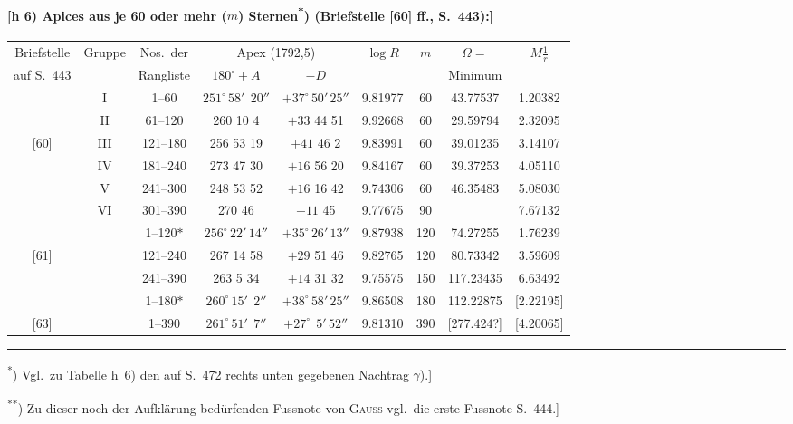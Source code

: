 \documentclass[12pt,a4paper]{article}
\theoremstyle{plain}
\theoremstyle{definition}
\theoremstyle{remark}
\begin{document}
\medskip
\paragraph*{[h 6) Apices aus je 60 oder mehr ($m$) Sternen\textsuperscript{*})
(Briefstelle [60] ff., S.~443):]}

\begin{small}
\begin{center}
\begin{tabular}{|c|c|c||c|c||c|c|c|c|}
\hline
Briefstelle & Gruppe & Nos.~der &
\multicolumn{2}{c||}{Apex (1792,5)} &
$\log R$ & $m$ & $\Omega =$ & $M\frac{1}{r}$ \\
auf S.~443 & & Rangliste & $180^{\circ}+A$ & $-D$ & & & Minimum & \\
\hline
& I & 1--\phantom{0}60 & $251^{\circ}\,58'\;\,20''$ & $+37^{\circ}\,50'\,25''$ & 9.81977 & 60 & 43.77537 & 1.20382 \\
& II & 61--120 & 260 \phantom{0}10 \phantom{0}\phantom{0}4 & $+33$ 44 51 & 9.92668 & 60 & 29.59794 & 2.32095 \\
{[60]} & III & 121--180 & 256 53 19 & $+41$ 46 \phantom{0}2 & 9.83991 & 60 & 39.01235 & 3.14107 \\
& IV & 181--240 & 273 47 30 & $+16$ 56 20 & 9.84167 & 60 & 39.37253 & 4.05110 \\
& V & 241--300 & 248 53 52 & $+16$ 16 42 & 9.74306 & 60 & 46.35483 & 5.08030 \\
& VI & 301--390 & 270 46 & $+11$ 45 & 9.77675 & 90 & & 7.67132 \\
\hline
& & 1--120$*$ & $256^{\circ}\,22'\,14''$ & $+35^{\circ}\,26'\,13''$ & 9.87938 & 120 & 74.27255 & 1.76239 \\
{[61]} & & 121--240 & 267 14 58 & $+29$ 51 46 & 9.82765 & 120 & 80.73342 & 3.59609 \\
& & 241--390 & 263 \phantom{0}5 34 & $+14$ 31 32 & 9.75575 & 150 & 117.23435 & 6.63492 \\
\hline
& & 1--180$*$ & $260^{\circ}\,15'\;\,2''$ & $+38^{\circ}\,58'\,25''$ & 9.86508 & 180 & 112.22875 & [2.22195] \\
{[63]} & & 1--390 & $261^{\circ}\,51'\;\,7''$ & $+27^{\circ}\;\,5'\,52''$ & 9.81310 & 390 & [277.424?] & [4.20065] \\
\hline
\end{tabular}
\end{center}
\end{small}

\medskip
\noindent\rule{\textwidth}{0.4pt}
\begin{footnotesize}
\textsuperscript{*}) Vgl.~zu Tabelle h~6) den auf S.~472 rechts unten gegebenen Nachtrag $\gamma$).]

\textsuperscript{**}) Zu dieser noch der Aufkl\"arung bed\"urfenden Fussnote von \textsc{Gau\ss}
vgl.~die erste Fussnote S.~444.]
\end{footnotesize}
\end{document}
